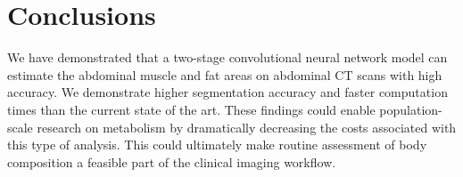 \documentclass{llncs}
\begin{document}
\section{Conclusions}
We have demonstrated that a two-stage convolutional neural network model can estimate the abdominal muscle and fat areas on abdominal CT scans with high accuracy.
We demonstrate higher segmentation accuracy and faster computation times than the current state of the art.
These findings could enable population-scale research on metabolism by dramatically decreasing the costs associated with this type of analysis.
This could ultimately make routine assessment of body composition a feasible part of the clinical imaging workflow. 




\end{document}
